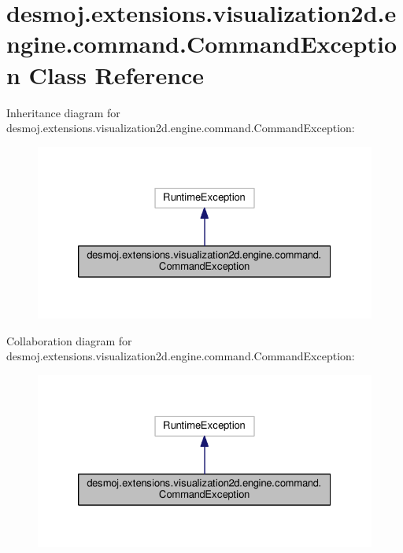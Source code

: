 \section{desmoj.\-extensions.\-visualization2d.\-engine.\-command.\-Command\-Exception Class Reference}
\label{classdesmoj_1_1extensions_1_1visualization2d_1_1engine_1_1command_1_1_command_exception}


Inheritance diagram for desmoj.\-extensions.\-visualization2d.\-engine.\-command.\-Command\-Exception\-:
\nopagebreak
\begin{figure}[H]
\begin{center}
\leavevmode
\includegraphics[width=326pt]{classdesmoj_1_1extensions_1_1visualization2d_1_1engine_1_1command_1_1_command_exception__inherit__graph}
\end{center}
\end{figure}


Collaboration diagram for desmoj.\-extensions.\-visualization2d.\-engine.\-command.\-Command\-Exception\-:
\nopagebreak
\begin{figure}[H]
\begin{center}
\leavevmode
\includegraphics[width=326pt]{classdesmoj_1_1extensions_1_1visualization2d_1_1engine_1_1command_1_1_command_exception__coll__graph}
\end{center}
\end{figure}

